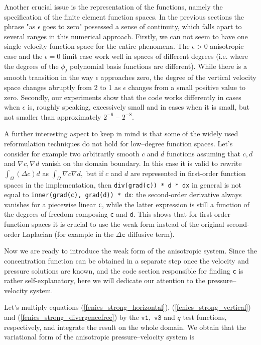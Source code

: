 \documentclass[12pt]{report}
\numberwithin{theorem}{chapter}
\numberwithin{corollary}{chapter}
\numberwithin{lemma}{chapter}
\numberwithin{remark}{chapter}
\numberwithin{definition}{chapter}
\numberwithin{prop}{chapter}
\begin{document}
Another crucial issue is the representation of the functions, namely the specification of the finite element function spaces. In the previous sections the phrase "as $\epsilon$ goes to zero" possessed a sense of continuity, which falls apart to several ranges in this numerical approach. Firstly, we can not seem to have one single velocity function space for the entire phenomena. The $\epsilon > 0$ anisotropic case and the $\epsilon = 0$ limit case work well in spaces of different degrees (i.e. where the degrees of the $\phi_j$ polynomial basis functions are different). While there is a smooth transition in the way $\epsilon$ approaches zero, the degree of the vertical velocity space changes abruptly from 2 to 1 as $\epsilon$ changes from a small positive value to zero. Secondly, our experiments show that the code works differently in cases when $\epsilon$ is, roughly speaking, excessively small and in cases when it is small, but not smaller than approximately $2^{-6}$ -- $2^{-8}.$

A further interesting aspect to keep in mind is that some of the widely used reformulation techniques do not hold for low--degree function spaces. Let's consider for example two arbitrarily smooth $c$ and $d$ functions assuming that $c, d$ and $\nabla c, \nabla d$ vanish on the domain boundary. In this case it is valid to rewrite $\int _\Omega (\Delta c) d$ as $\int_\Omega \nabla c \nabla d,$ but if $c$ and $d$ are represented in first-order function spaces in the implementation, then \texttt{div(grad(c)) * d * dx} in general is not equal to \texttt{inner(grad(c), grad(d)) * dx}: the second-order derivative always vanishes for a piecewise linear \texttt{c}, while the latter expression is still a function of the degrees of freedom composing \texttt{c} and \texttt{d}. This shows that for first-order function spaces it is crucial to use the weak form instead of the original second-order Laplacian (for example in the $\Delta \texttt{c}$ diffusive term).

Now we are ready to introduce the weak form of the anisotropic system. Since the concentration function can be obtained in a separate step once the velocity and pressure solutions are known, and the code section responsible for finding \texttt{c} is rather self-explanatory, here we will dedicate our attention to the pressure--velocity system.

Let's multiply equations (\ref{fenics_strong_horizontal}), (\ref{fenics_strong_vertical}) and (\ref{fenics_strong_divergencefree}) by the $\texttt{v1},$ $\texttt{v3}$  and $q$ test functions, respectively, and integrate the result on the whole domain. We obtain that the variational form of the anisotropic pressure--velocity system is
\end{document}
